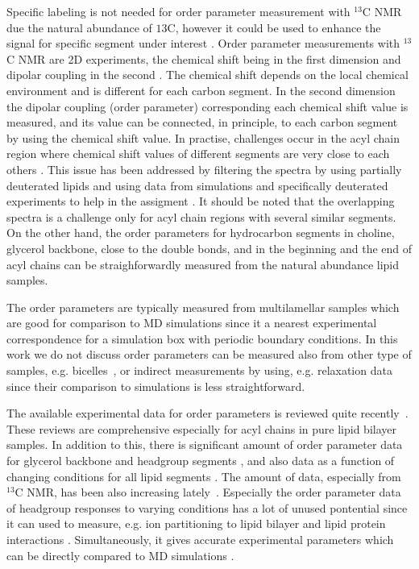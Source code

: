 \documentclass[aps,prl,superscriptaddress,twocolumn]{revtex4}
\begin{document}
Specific labeling is not needed for order parameter measurement with $^{13}$C NMR due the 
natural abundance of $ {13}$C, however it could be used to enhance the signal for specific 
segment under interest \cite{??}. Order parameter measurements with $^{13}$C NMR are
2D experiments, the chemical shift being in the first dimension and dipolar coupling 
in the second \cite{??}. The chemical shift depends on the local chemical environment and 
is different for each carbon segment. In the second dimension the dipolar coupling
(order parameter) corresponding each chemical shift value is measured, and its value 
can be connected, in principle, to each carbon segment by using the chemical shift value.  
In practise, challenges occur in the acyl chain region where chemical shift values 
of different segments are very close to each others \cite{hong95a,gross97,dvinskikh05a,ferreira13,leftin14}. This issue has been
addressed by filtering the spectra by using partially deuterated lipids \cite{ferreira13}
and using data from simulations and specifically deuterated experiments to help in 
the assigment \cite{ferreira13,leftin14}. It should be noted that the overlapping spectra 
is a challenge only for acyl chain regions with several similar segments. On the other hand, 
the order parameters for hydrocarbon segments in choline, glycerol backbone, close to the 
double bonds, and in the beginning and the end of acyl chains can be straighforwardly 
measured from the natural abundance lipid samples. 

The order parameters are typically measured from multilamellar samples which are good for comparison to MD 
simulations since it a nearest experimental correspondence for a simulation box with periodic boundary conditions. 
In this work we do not discuss order parameters can be measured also from other type of samples, 
e.g. bicelles~\cite{aussenac03,raffard00,sanders92}, or indirect measurements by using, e.g. relaxation
data~\cite{??} since their comparison to simulations is less straightforward.  

The available experimental data for order parameters is reviewed
quite recently~\cite{leftin11,marsh13}. These reviews are comprehensive especially for 
acyl chains in pure lipid bilayer samples. In addition to this, there is significant
amount of order parameter data for glycerol backbone and headgroup segments \cite{botan15}, and
also data as a function of changing conditions for all lipid segments \cite{akutsu81,dvinskikh05a,mallikarjunaiah11,ferreira13,??}.
The amount of data, especially from $^{13}$C NMR, has been also increasing lately~\cite{ferreira13,leftin13,leftin14}.
Especially the order parameter data of headgroup responses to varying conditions 
has a lot of unused pontential since it can used to measure, e.g. ion partitioning to lipid
bilayer \cite{akutsu81,??,ionpaper} and lipid protein interactions \cite{roux89,kuchinka89,leftin13}. Simultaneously, it
gives accurate experimental parameters which can be directly compared to MD simulations \cite{botan15,ionpaper}.
\end{document}
